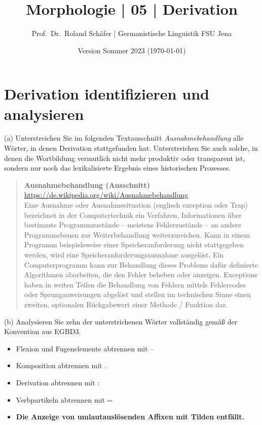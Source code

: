 \documentclass[12pt,a4paper,twoside]{article}
\author{Prof.\ Dr.\ Roland Schäfer | Germanistische Linguistik FSU Jena}
\title{Morphologie | 05 | Derivation}
\date{Version Sommer 2023 (\today)}
\newcommand{\Zeile}{\vspace{\baselineskip}}
\newcommand{\Lf}{
  \setlength{\itemsep}{1pt}
  \setlength{\parskip}{0pt}
  \setlength{\parsep}{0pt}
}
\begin{document}
\maketitle

\section{Derivation identifizieren und analysieren}

(a) Unterstreichen Sie im folgenden Textausschnitt \textit{Ausnahmebehandlung} alle Wörter, in denen Derivation stattgefunden hat.
Unterstreichen Sie auch solche, in denen die Wortbildung vermutlich nicht mehr produktiv oder transparent ist, sondern nur noch das lexikalisierte Ergebnis eines historischen Prozesses.

 \begin{quote}\onehalfspacing
   \textbf{Ausnahmebehandlung (Ausschnitt)}\\
   {\footnotesize\url{https://de.wikipedia.org/wiki/Ausnahmebehandlung}}\\

   Eine Ausnahme oder Ausnahmesituation (englisch exception oder Trap) bezeichnet in der Computertechnik ein Verfahren, Informationen über bestimmte Programmzustände – meistens Fehlerzustände – an andere Programmebenen zur Weiterbehandlung weiterzureichen.
Kann in einem Programm beispielsweise einer Speicheranforderung nicht stattgegeben werden, wird eine Speicheranforderungsausnahme ausgelöst. Ein Computerprogramm kann zur Behandlung dieses Problems dafür definierte Algorithmen abarbeiten, die den Fehler beheben oder anzeigen.
Exceptions haben in weiten Teilen die Behandlung von Fehlern mittels Fehlercodes oder Sprunganweisungen abgelöst und stellen im technischen Sinne einen zweiten, optionalen Rückgabewert einer Methode / Funktion dar.
 \end{quote}

\Zeile

(b) Analysieren Sie zehn der unterstrichenen Wörter vollständig gemäß der Konvention aus EGBD3.

\begin{itemize}\Lf
  \item Flexion und Fugenelemente abtrennen mit --
  \item Komposition abtrennen mit .
  \item Derivation abtrennen mit :
  \item Verbpartikeln abtrennen mit =
  \item \textbf{Die Anzeige von umlautauslösenden Affixen mit Tilden entfällt.}
\end{itemize}
\end{document}
